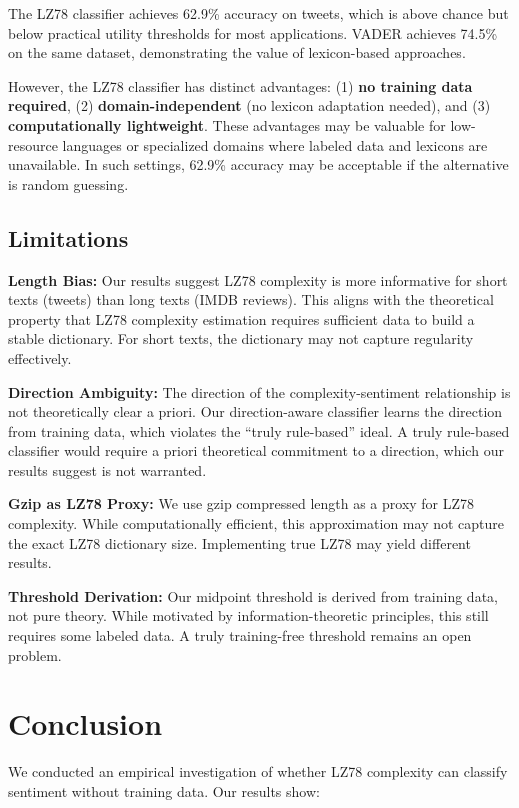 \documentclass[11pt,letterpaper]{article}
\begin{document}
The LZ78 classifier achieves 62.9\% accuracy on tweets, which is above chance but below practical utility thresholds for most applications. VADER achieves 74.5\% on the same dataset, demonstrating the value of lexicon-based approaches.

However, the LZ78 classifier has distinct advantages: (1) \textbf{no training data required}, (2) \textbf{domain-independent} (no lexicon adaptation needed), and (3) \textbf{computationally lightweight}. These advantages may be valuable for low-resource languages or specialized domains where labeled data and lexicons are unavailable. In such settings, 62.9\% accuracy may be acceptable if the alternative is random guessing.

\subsection{Limitations}

\textbf{Length Bias:} Our results suggest LZ78 complexity is more informative for short texts (tweets) than long texts (IMDB reviews). This aligns with the theoretical property that LZ78 complexity estimation requires sufficient data to build a stable dictionary. For short texts, the dictionary may not capture regularity effectively.

\textbf{Direction Ambiguity:} The direction of the complexity-sentiment relationship is not theoretically clear a priori. Our direction-aware classifier learns the direction from training data, which violates the ``truly rule-based'' ideal. A truly rule-based classifier would require a priori theoretical commitment to a direction, which our results suggest is not warranted.

\textbf{Gzip as LZ78 Proxy:} We use gzip compressed length as a proxy for LZ78 complexity. While computationally efficient, this approximation may not capture the exact LZ78 dictionary size. Implementing true LZ78 may yield different results.

\textbf{Threshold Derivation:} Our midpoint threshold is derived from training data, not pure theory. While motivated by information-theoretic principles, this still requires some labeled data. A truly training-free threshold remains an open problem.

\section{Conclusion}

We conducted an empirical investigation of whether LZ78 complexity can classify sentiment without training data. Our results show:
\end{document}
